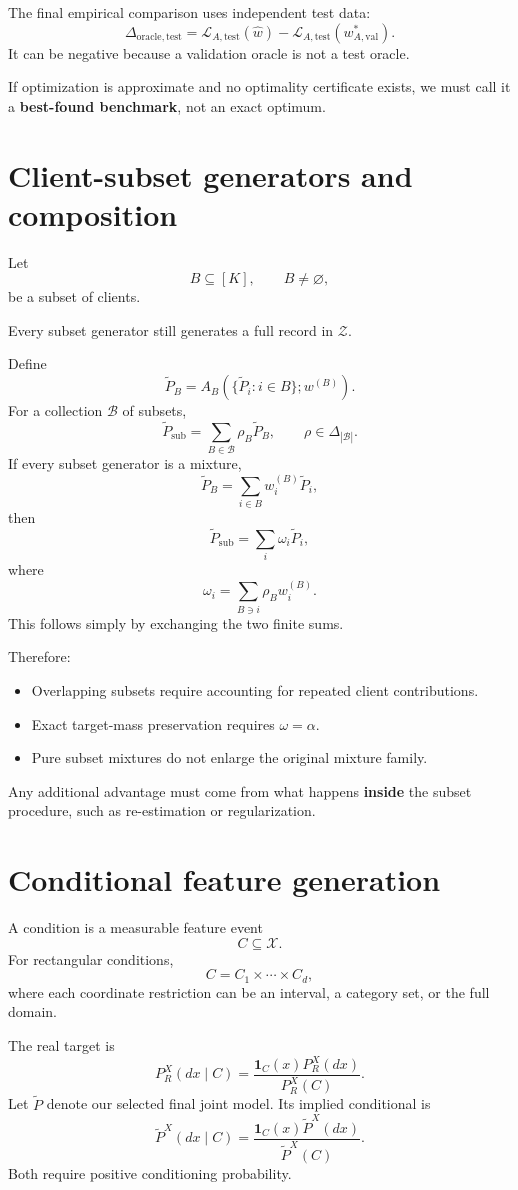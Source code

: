 \documentclass[11pt,a4paper]{article}
\begin{document}
The final empirical comparison uses independent test data:
\[
\Delta_{\mathrm{oracle,test}}=\mathcal L_{A,\mathrm{test}}(\widehat w)
-\mathcal L_{A,\mathrm{test}}(w^*_{A,\mathrm{val}}).
\]
It can be negative because a validation oracle is not a test oracle.

If optimization is approximate and no optimality certificate exists, we must call it a \textbf{best-found benchmark}, not an exact optimum.

\section{Client-subset generators and composition}
Let
\[
B\subseteq[K],\qquad B\neq\varnothing,
\]
be a subset of clients.

Every subset generator still generates a full record in $\mathcal Z$.

Define
\[
\widetilde P_B=A_B\left(\{\widetilde P_i:i\in B\};w^{(B)}\right).
\]
For a collection $\mathcal B$ of subsets,
\[
\widetilde P_{\mathrm{sub}}=\sum_{B\in\mathcal B}\rho_B\widetilde P_B,
\qquad\rho\in\Delta_{|\mathcal B|}.
\]
If every subset generator is a mixture,
\[
\widetilde P_B=\sum_{i\in B}w_i^{(B)}\widetilde P_i,
\]
then
\[
\boxed{\widetilde P_{\mathrm{sub}}=\sum_i\omega_i\widetilde P_i,}
\]
where
\[
\boxed{\omega_i=\sum_{B\ni i}\rho_Bw_i^{(B)}.}
\]
This follows simply by exchanging the two finite sums.

Therefore:
\begin{itemize}
\item Overlapping subsets require accounting for repeated client contributions.
\item Exact target-mass preservation requires $\omega=\alpha$.
\item Pure subset mixtures do not enlarge the original mixture family.
\end{itemize}
Any additional advantage must come from what happens \textbf{inside} the subset procedure, such as re-estimation or regularization.

\section{Conditional feature generation}
A condition is a measurable feature event
\[
C\subseteq\mathcal X.
\]
For rectangular conditions,
\[
C=C_1\times\cdots\times C_d,
\]
where each coordinate restriction can be an interval, a category set, or the full domain.

The real target is
\[
\boxed{P_R^X(dx\mid C)=\frac{\mathbf1_C(x)P_R^X(dx)}{P_R^X(C)}.}
\]
Let $\widetilde P$ denote our selected final joint model. Its implied conditional is
\[
\widetilde P^X(dx\mid C)=\frac{\mathbf1_C(x)\widetilde P^X(dx)}{\widetilde P^X(C)}.
\]
Both require positive conditioning probability.
\end{document}
